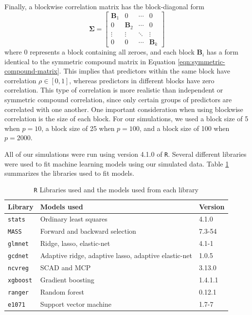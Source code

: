 \documentclass{article}
\begin{document}
Finally, a blockwise correlation matrix has the block-diagonal form
\begin{equation}
	\mathbf{\Sigma} = \begin{bmatrix}
		\mathbf{B}_1 & 0 & \cdots & 0 \\
		0 & \mathbf{B}_2 & \cdots & 0 \\
		\vdots & \vdots & \ddots & \vdots \\
		0 & 0 & \cdots & \mathbf{B}_k
	\end{bmatrix}
\end{equation}
where $0$ represents a block containing all zeroes, and each block $\mathbf{B}_i$ has a form identical to the symmetric compound matrix in Equation \ref{eqn:symmetric-compound-matrix}. This implies that predictors within the same block have correlation $\rho\in [0, 1]$, whereas predictors in different blocks have zero correlation. This type of correlation is more realistic than independent or symmetric compound correlation, since only certain groups of predictors are correlated with one another. One important consideration when using blockwise correlation is the size of each block. For our simulations, we used a block size of 5 when $p = 10$, a block size of 25 when $p = 100$, and a block size of 100 when $p = 2000$.

All of our simulations were run using version 4.1.0 of \lstinline!R!. Several different libraries were used to fit machine learning models using our simulated data. Table \ref{tab:model-libraries} summarizes the libraries used to fit models.

\begin{table}[h]
	\centering
	\caption{\lstinline!R! Libraries used and the models used from each library}
	\label{tab:model-libraries}
	\begin{tabular}{lll}\hline
		\textbf{Library}    & \textbf{Models used}                                 & \textbf{Version} \\ \hline
		\lstinline!stats!   & Ordinary least squares                               & 4.1.0            \\
		\lstinline!MASS!    & Forward and backward selection                       & 7.3-54           \\
		\lstinline!glmnet!  & Ridge, lasso, elastic-net                            & 4.1-1            \\
		\lstinline!gcdnet!  & Adaptive ridge, adaptive lasso, adaptive elastic-net & 1.0.5            \\
		\lstinline!ncvreg!  & SCAD and MCP                                         & 3.13.0           \\
		\lstinline!xgboost! & Gradient boosting                                    & 1.4.1.1          \\
		\lstinline!ranger!  & Random forest                                        & 0.12.1           \\
		\lstinline!e1071!   & Support vector machine                               & 1.7-7            \\\hline
	\end{tabular}
\end{table}
\end{document}

